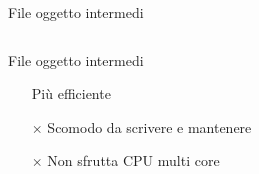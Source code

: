 \documentclass[xetex,table]{beamer}
\begin{document}
\begin{frame}[fragile]{File oggetto intermedi}
  \small\inputminted[bgcolor=codebackground,frame=single]{shell}{examples/1-shell-2/build.sh}
\end{frame}

\begin{frame}{File oggetto intermedi}
  \begin{itemize}
  \item[\checkmark] Più efficiente
  \item[$\times$]   Scomodo da scrivere e mantenere
  \item[$\times$]   Non sfrutta CPU multi core
  \end{itemize}
\end{frame}
\end{document}
